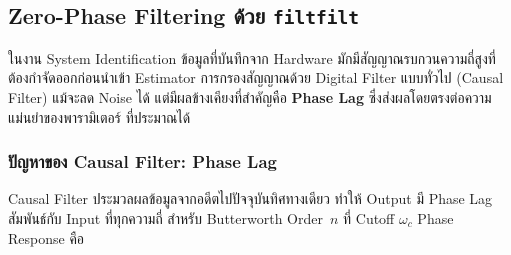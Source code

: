 



\subsection{Zero-Phase Filtering ด้วย \texttt{filtfilt}}
\label{subsec:filtfilt}

ในงาน System Identification ข้อมูลที่บันทึกจาก Hardware
มักมีสัญญาณรบกวนความถี่สูงที่ต้องกำจัดออกก่อนนำเข้า Estimator
การกรองสัญญาณด้วย Digital Filter แบบทั่วไป (Causal Filter)
แม้จะลด Noise ได้ แต่มีผลข้างเคียงที่สำคัญคือ
\textbf{Phase Lag} ซึ่งส่งผลโดยตรงต่อความแม่นยำของพารามิเตอร์
ที่ประมาณได้

\subsubsection{ปัญหาของ Causal Filter: Phase Lag}

Causal Filter ประมวลผลข้อมูลจากอดีตไปปัจจุบันทิศทางเดียว
ทำให้ Output มี Phase Lag สัมพันธ์กับ Input
ที่ทุกความถี่ สำหรับ Butterworth Order~$n$ ที่ Cutoff $\omega_c$
Phase Response คือ

